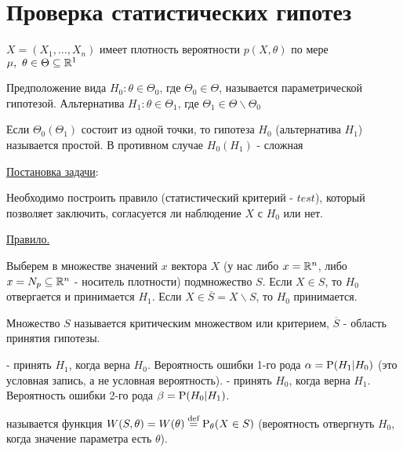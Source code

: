\section{Проверка статистических гипотез}
\(X = (X_1, \ldots, X_n)\) имеет плотность вероятности \(p(X, \theta)\)
по мере \(\mu,\ \theta\in\Theta\subseteq\R^1\)

\begin{definition}
    Предположение вида \(H_0: \theta\in\Theta_0\), где
    \(\Theta_0\in\Theta\), называется параметрической гипотезой.
    Альтернатива \(H_1:\theta\in\Theta_1\), где
    \(\Theta_1\in\Theta\backslash\Theta_0\)
\end{definition}

\begin{definition}
    Если \(\Theta_0(\Theta_1)\) состоит из одной точки,
    то гипотеза \(H_0\) (альтернатива \(H_1\)) называется
    простой.
    В противном случае \(H_0(H_1)\) - сложная
\end{definition}

\underline{Постановка задачи}:

Необходимо построить правило (статистический критерий - \(test\)),
который позволяет заключить, согласуется ли наблюдение \(X\)
с \(H_0\) или нет.

\underline{Правило.}

Выберем в множестве значений \(x\) вектора \(X\) (у нас либо
\(x = \R^n\), либо \(x = N_p \subseteq \R^n\) - носитель
плотности) подмножество \(S\). Если \(X \in S\), то \(H_0\) отвергается и
принимается \(H_1\). Если \(X \in \overline{S} = X \backslash S\), то
\(H_0\) принимается.

\begin{definition}
    Множество \(S\) называется критическим множеством или критерием,
    \(\overline{S}\) - область принятия гипотезы.
\end{definition}

\begin{definition}
     - принять \(H_1\), когда
    верна \(H_0\). Вероятность ошибки 1-го рода $\alpha
    = \P(H_1 | H_0)$ (это условная запись, а не условная вероятность).
     - принять \(H_0\), когда
    верна \(H_1\). Вероятность ошибки 2-го рода $\beta
    = \P(H_0 | H_1)$.
\end{definition}

\begin{definition}
     называется функция \(W(S, \theta) = W(\theta)
    \defeq\P_\theta(X\in S)\) (вероятность отвергнуть \(H_0\), когда
    значение параметра есть \(\theta\)).
\end{definition}


